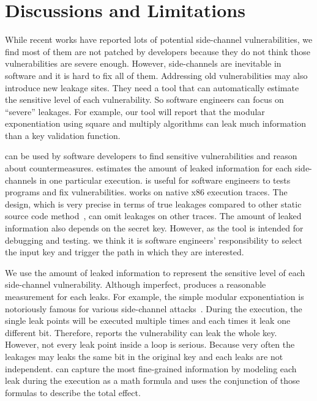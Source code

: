 \section{Discussions and Limitations}
While recent works have reported lots
of potential side-channel vulnerabilities, we find most of them are not patched by
developers because they do not think those vulnerabilities are severe enough.
However, side-channels are inevitable in software and it is hard to fix all of them. 
Addressing old vulnerabilities may also introduce new leakage
sites. They need a
tool that can automatically estimate the sensitive level of each vulnerability.
So software engineers can focus on
``severe'' leakages. For example, our tool will report that 
the modular exponentiation using square and multiply algorithms can
leak much information than a key validation function.

\tool{} can be used by software developers to find sensitive vulnerabilities
and reason about countermeasures.
\tool{} estimates the amount of leaked information for each side-channels
in one particular execution. \tool{} is useful for software
engineers to tests programs and fix vulnerabilities.
\tool{} works on native x86 execution traces. The design, which is very
precise in terms of true leakages compared to other static source code
method~\cite{197207,BacelarAlmeida:2013:FVS:2483313.2483334}, can omit
leakages on other traces. The amount of leaked information also depends on the secret key.
However, as the tool is intended for debugging and testing.
we think it is software engineers' responsibility to select the input key and trigger the 
path in which they are interested.

We use the amount of leaked information to represent the sensitive level of each
side-channel vulnerability. Although imperfect, \tool{} produces a reasonable
measurement for each leaks. For example, the simple modular exponentiation is notoriously
famous for various side-channel attacks~\cite{kocher1996timing}. During the execution, the single 
leak points will be executed multiple times and each times it leak one different bit.
Therefore, \tool{} reports the vulnerability can leak the whole key. However, not every
leak point inside a loop is serious. Because very often the leakages may leaks the same
bit in the original key and each leaks are not independent. \tool{} can capture the most 
fine-grained information by
modeling each leak during the execution 
as a math formula and uses the conjunction of those formulas to describe the total effect.

